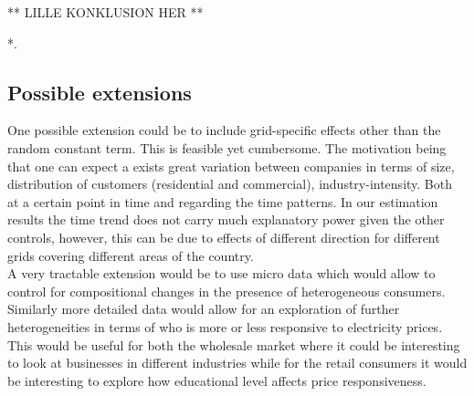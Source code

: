 ** LILLE KONKLUSION HER **


*. %


\subsection{Possible extensions}
\label{subsec:r_extensions}
One possible extension could be to include grid-specific effects other than the random constant term. This is feasible yet cumbersome. The motivation being that one can expect a exists great variation between companies in terms of size, distribution of customers (residential and commercial), industry-intensity. Both at a certain point in time and regarding the time patterns. In our estimation results the time trend does not carry much explanatory power given the other controls, however, this can be due to effects of different direction for different grids covering different areas of the country.
\medskip\\
A very tractable extension would be to use micro data which would allow to control for compositional changes in the presence of heterogeneous consumers. Similarly more detailed data would allow for an exploration of further heterogeneities in terms of who is more or less responsive to electricity prices. This would be useful for both the wholesale market where it could be interesting to look at businesses in different industries while for the retail consumers it would be interesting to explore how educational level affects price responsiveness.
